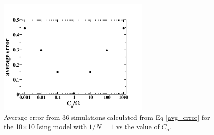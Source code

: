 \documentclass[aps,prl,reprint,superscriptaddress,showkeys]{revtex4-1}
\begin{document}
\begin{figure}[h!]
\includegraphics[width=7.5cm]{./figures/optimalCo.png}
\caption{Average error from 36 simulations calculated from Eq \ref{avg_error} for the 10$\times$10 Ising model with $1/N=1$ vs the value of $C_{o}$.  \label{optimalCo}}
\end{figure}
\end{document}
